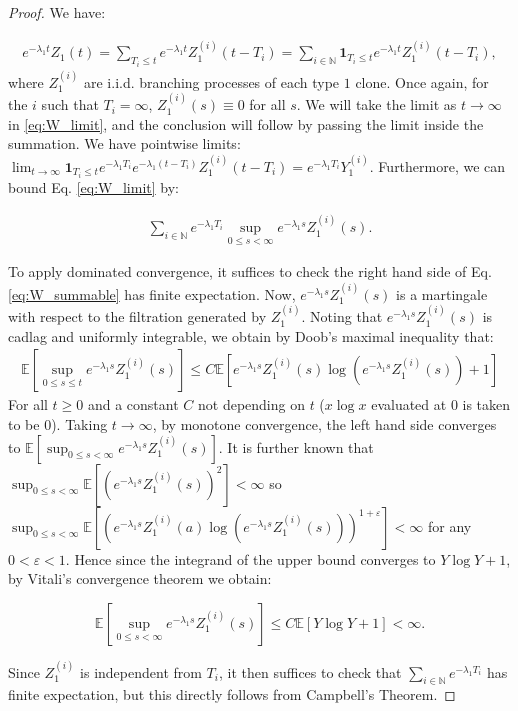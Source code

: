 \documentclass{article}
\numberwithin{equation}{section}
\begin{document}
\begin{proof}
  We have:

  \begin{align}
    e^{-\lambda_1 t}Z_1(t)=\sum_{T_i\leq t} e^{-\lambda_1 t}Z_1^{(i)}(t-T_i)=\sum_{i\in \mathbb{N}}\mathbf{1}_{T_i\leq t}e^{-\lambda_1 t}Z_1^{(i)}(t-T_i),\label{eq:W_limit}
  \end{align}
where $Z_1^{(i)}$ are i.i.d. branching processes of each type $1$ clone.  Once again, for the $i$ such that $T_i=\infty$, $Z_1^{(i)}(s)\equiv 0$ for all $s$. We will take the limit as $t\to\infty$ in \eqref{eq:W_limit}, and the conclusion will follow by passing the limit inside the summation.  We have pointwise limits: $\lim_{t\to\infty}\mathbf{1}_{T_i\leq t}e^{-\lambda_1 T_i}e^{-\lambda_1(t-T_i)}Z_1^{(i)}(t-T_i)=e^{-\lambda_1 T_i}Y_1^{(i)}$. Furthermore, we can bound Eq. \ref{eq:W_limit} by:

  \begin{align}
    \sum_{i\in \mathbb{N}}e^{-\lambda_1 T_i}\sup_{0\leq s< \infty}e^{-\lambda_1s}Z_1^{(i)}(s).\label{eq:W_summable}
  \end{align}

  To apply dominated convergence, it suffices to check the right hand side of Eq. \ref{eq:W_summable} has finite expectation. Now, $e^{-\lambda_1s}Z_1^{(i)}(s)$ is a martingale with respect to the filtration generated by $Z_1^{(i)}$. Noting that $e^{-\lambda_1 s}Z_1^{(i)}(s)$ is cadlag and uniformly integrable, we obtain by Doob's maximal inequality that:
  \begin{align*}
      \mathbb{E}[\sup_{0\leq s\leq t}e^{-\lambda_1 s}Z_1^{(i)}(s)]\leq C\mathbb{E}[e^{-\lambda_1 s}Z_1^{(i)}(s)\log(e^{-\lambda_1 s}Z_1^{(i)}(s))+1]
  \end{align*}
  For all $t\geq 0$ and a constant $C$ not depending on $t$ ($x\log x$ evaluated at $0$ is taken to be $0$). Taking $t\to\infty$, by monotone convergence, the left hand side converges to $\mathbb{E}[\sup_{0\leq s<\infty}e^{-\lambda_1 s}Z_1^{(i)}(s)]$. It is further known that $\sup_{0\leq s<\infty}\mathbb{E}[(e^{-\lambda_1 s}Z_1^{(i)}(s))^2]<\infty$ so $\sup_{0\leq s<\infty}\mathbb{E}\left[\left(e^{-\lambda_1 s}Z_1^{(i)}(a)\log(e^{-\lambda_1 s}Z_1^{(i)}(s))\right)^{1+\varepsilon}\right]<\infty$ for any $0<\varepsilon<1$. Hence since the integrand of the upper bound converges to $Y\log Y+1$, by Vitali's convergence theorem we obtain:
  
  \[\mathbb{E}\left[\sup_{0\leq s< \infty}e^{-\lambda_1s}Z_1^{(i)}(s)\right]\leq C\mathbb{E}[Y\log Y+1]<\infty.\]

  Since $Z_1^{(i)}$ is independent from $T_i$, it then suffices to check that $\sum_{i\in \mathbb{N}}e^{-\lambda_1 T_i}$ has finite expectation, but this directly follows from Campbell's Theorem.

\end{proof}
\end{document}
